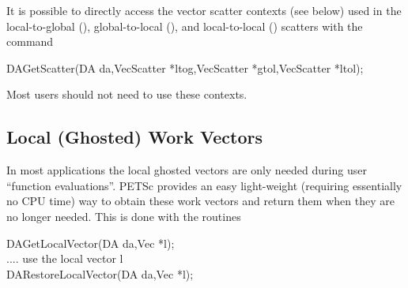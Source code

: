 It is possible to directly access the vector scatter contexts (see below)
used in the local-to-global (), global-to-local 
(), and local-to-local ()
scatters with the command 
\begin{tabbing}
  DAGetScatter(DA da,VecScatter *ltog,VecScatter *gtol,VecScatter *ltol);
\end{tabbing}
Most users should not need to use these contexts.

\subsection{Local (Ghosted) Work Vectors}
In most applications the local ghosted vectors are only needed during user
``function evaluations''. PETSc provides an easy light-weight (requiring 
essentially no CPU time) way to obtain these work vectors and return them when
they are no longer needed. This is done with the routines
\begin{tabbing}
  DAGetLocalVector(DA da,Vec *l);\\
   .... use the local vector l\\
  DARestoreLocalVector(DA da,Vec *l);
\end{tabbing}

